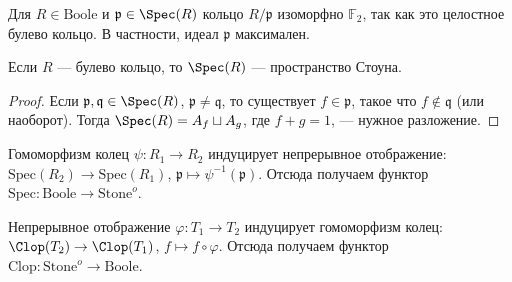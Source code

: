 \documentclass[
	extrafontsizes,
	11pt,
	hyphens,
]{memoir}
\begin{document}
\begin{remark}
Для $R \in \mathrm{Boole}$ и $\mathfrak{p} \in \Spec(R)$ кольцо $R / \mathfrak{p}$ изоморфно $\mathbb{F}_2$, так как это целостное булево кольцо. 
В частности, идеал \(\mathfrak{p}\) максимален.
\end{remark}

\begin{lemma}
Если \(R\) --- булево кольцо, то \(\Spec(R)\) --- пространство Стоуна.
\end{lemma}

\begin{proof}
Если $\mathfrak{p},\mathfrak{q} \in \Spec(R)$, $\mathfrak{p} \neq \mathfrak{q}$, то существует $f \in \mathfrak{p}$, такое что $f \notin \mathfrak{q}$ (или наоборот).
Тогда $\Spec(R) = A_f \sqcup A_{g}$, где $f+g=1$, --- нужное разложение.
\end{proof}


\begin{definition}
Гомоморфизм колец $\psi : R_1 \to R_2$ индуцирует непрерывное отображение: $\mathrm{Spec}(R_2) \to \mathrm{Spec}(R_1)$, $\mathfrak{p} \mapsto \psi^{-1}(\mathfrak{p})$.
Отсюда получаем функтор
\(\mathrm{Spec} : \mathrm{Boole} \to \mathrm{Stone}^{o}\).
\end{definition}

\begin{definition}
Непрерывное отображение $\varphi: T_1 \to T_2$ индуцирует гомоморфизм колец: $\Clop(T_2) \to \Clop(T_1)$, $f \mapsto f \circ \varphi$.
Отсюда получаем функтор
\(\mathrm{Clop} : \mathrm{Stone}^{o} \to \mathrm{Boole}\).
\end{definition}

\end{document}
